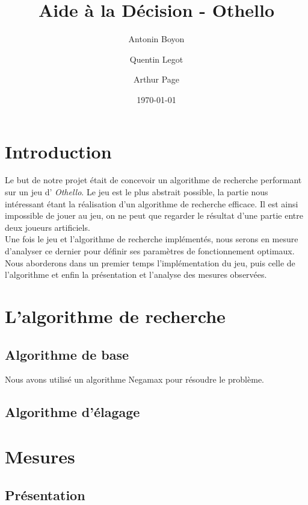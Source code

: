 \documentclass[12pt]{article}
\title{Aide à la Décision - Othello}
\author{Antonin Boyon \and Quentin Legot \and Arthur Page}
\date{\today}
\begin{document}
\maketitle
\thispagestyle{empty}
\setcounter{page}{0}
\newpage

\tableofcontents
\newpage

\section{Introduction}

Le but de notre projet était de concevoir un algorithme de recherche performant sur un jeu d' \textit{Othello}. Le jeu est le plus abstrait possible, la partie nous intéressant étant la réalisation d'un algorithme de recherche efficace. Il est ainsi impossible de jouer au jeu, on ne peut que regarder le résultat d'une partie entre deux joueurs artificiels.\\
Une fois le jeu et l'algorithme de recherche implémentés, nous serons en mesure d'analyser ce dernier pour définir ses paramètres de fonctionnement optimaux. Nous aborderons dans un premier temps l'implémentation du jeu, puis celle de l'algorithme et enfin la présentation et l'analyse des mesures observées.

\section{L'algorithme de recherche}
\subsection{Algorithme de base}

Nous avons utilisé un algorithme Negamax pour résoudre le problème.



\subsection{Algorithme d'élagage}



\section{Mesures}

\subsection{Présentation}
\end{document}
